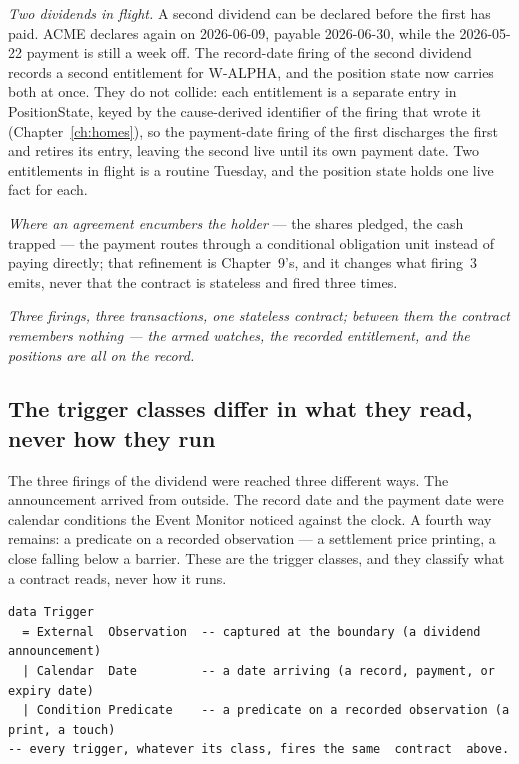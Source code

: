\documentclass[11pt,a4paper]{article}
\begin{document}
\emph{Two dividends in flight.} A second dividend can be declared before the first has paid.
ACME declares again on 2026-06-09, payable 2026-06-30, while the 2026-05-22 payment is still
a week off. The record-date firing of the second dividend records a second entitlement for
W-ALPHA, and the position state now carries both at once. They do not collide: each
entitlement is a separate entry in PositionState, keyed by the cause-derived identifier of the
firing that wrote it (Chapter~\ref{ch:homes}), so the payment-date firing of the first
discharges the first and retires its entry, leaving the second live until its own payment
date. Two entitlements in flight is a routine Tuesday, and the position state holds one live
fact for each.

\emph{Where an agreement encumbers the holder} --- the shares pledged, the cash
trapped --- the payment routes through a conditional obligation unit instead of
paying directly; that refinement is Chapter~9's, and it changes what firing~3
emits, never that the contract is stateless and fired three times.

\emph{Three firings, three transactions, one stateless contract; between them
the contract remembers nothing --- the armed watches, the recorded entitlement,
and the positions are all on the record.}

\subsection{The trigger classes differ in what they read, never how they run}

The three firings of the dividend were reached three different ways. The
announcement arrived from outside. The record date and the payment date were
calendar conditions the Event Monitor noticed against the clock. A fourth way
remains: a predicate on a recorded observation --- a settlement price printing,
a close falling below a barrier. These are the trigger classes, and they
classify what a contract reads, never how it runs.

\begin{lstlisting}
data Trigger
  = External  Observation  -- captured at the boundary (a dividend announcement)
  | Calendar  Date         -- a date arriving (a record, payment, or expiry date)
  | Condition Predicate    -- a predicate on a recorded observation (a print, a touch)
-- every trigger, whatever its class, fires the same  contract  above.
\end{lstlisting}
\end{document}

